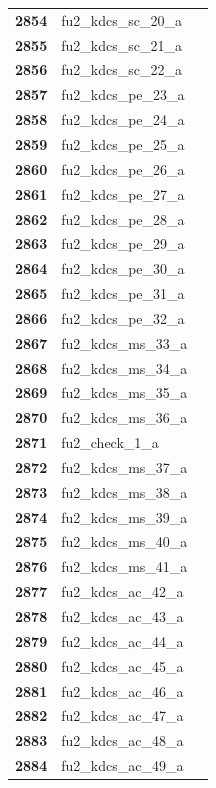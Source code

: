 \documentclass[
  letterpaper,
  DIV=11,
  numbers=noendperiod]{scrartcl}
\begin{document}
\begin{longtable}[t]{>{}cll}
\textbf{2854} & fu2\_kdcs\_sc\_20\_a & \\
\textbf{2855} & fu2\_kdcs\_sc\_21\_a & \\
\addlinespace
\textbf{2856} & fu2\_kdcs\_sc\_22\_a & \\
\textbf{2857} & fu2\_kdcs\_pe\_23\_a & \\
\textbf{2858} & fu2\_kdcs\_pe\_24\_a & \\
\textbf{2859} & fu2\_kdcs\_pe\_25\_a & \\
\textbf{2860} & fu2\_kdcs\_pe\_26\_a & \\
\addlinespace
\textbf{2861} & fu2\_kdcs\_pe\_27\_a & \\
\textbf{2862} & fu2\_kdcs\_pe\_28\_a & \\
\textbf{2863} & fu2\_kdcs\_pe\_29\_a & \\
\textbf{2864} & fu2\_kdcs\_pe\_30\_a & \\
\textbf{2865} & fu2\_kdcs\_pe\_31\_a & \\
\addlinespace
\textbf{2866} & fu2\_kdcs\_pe\_32\_a & \\
\textbf{2867} & fu2\_kdcs\_ms\_33\_a & \\
\textbf{2868} & fu2\_kdcs\_ms\_34\_a & \\
\textbf{2869} & fu2\_kdcs\_ms\_35\_a & \\
\textbf{2870} & fu2\_kdcs\_ms\_36\_a & \\
\addlinespace
\textbf{2871} & fu2\_check\_1\_a & \\
\textbf{2872} & fu2\_kdcs\_ms\_37\_a & \\
\textbf{2873} & fu2\_kdcs\_ms\_38\_a & \\
\textbf{2874} & fu2\_kdcs\_ms\_39\_a & \\
\textbf{2875} & fu2\_kdcs\_ms\_40\_a & \\
\addlinespace
\textbf{2876} & fu2\_kdcs\_ms\_41\_a & \\
\textbf{2877} & fu2\_kdcs\_ac\_42\_a & \\
\textbf{2878} & fu2\_kdcs\_ac\_43\_a & \\
\textbf{2879} & fu2\_kdcs\_ac\_44\_a & \\
\textbf{2880} & fu2\_kdcs\_ac\_45\_a & \\
\addlinespace
\textbf{2881} & fu2\_kdcs\_ac\_46\_a & \\
\textbf{2882} & fu2\_kdcs\_ac\_47\_a & \\
\textbf{2883} & fu2\_kdcs\_ac\_48\_a & \\
\textbf{2884} & fu2\_kdcs\_ac\_49\_a & \\

\end{longtable}
\end{document}
